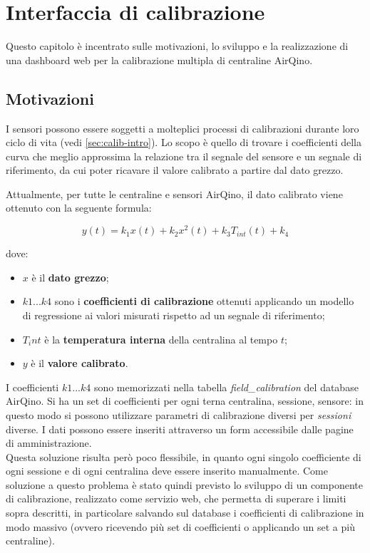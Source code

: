 \chapter{Interfaccia di calibrazione}\label{ch:interfaccia}
Questo capitolo è incentrato sulle motivazioni, lo sviluppo e la realizzazione di una dashboard web per la calibrazione multipla di centraline AirQino.

\section{Motivazioni}\label{sec:motivazioni}
I sensori possono essere soggetti a molteplici processi di calibrazioni durante loro ciclo di vita (vedi \ref{sec:calib-intro}). Lo scopo è quello di trovare i coefficienti della curva che meglio approssima la relazione tra il segnale del sensore e un segnale di riferimento, da cui poter ricavare il valore calibrato a partire dal dato grezzo.

Attualmente, per tutte le centraline e sensori AirQino, il dato calibrato viene ottenuto con la seguente formula:

$$y(t)=k_{1} x(t)+k_{2} x^{2}(t)+k_{3} T_{int}(t)+k_{4}$$\smallskip

dove:

\begin{itemize}
  \item $x$ è il \textbf{dato grezzo};
  \item $k1...k4$ sono i \textbf{coefficienti di calibrazione} ottenuti applicando un modello di regressione ai valori misurati rispetto ad un segnale di riferimento;
  \item $T_int$ è la \textbf{temperatura interna} della centralina al tempo $t$;
  \item $y$ è il \textbf{valore calibrato}.
\end{itemize}

I coefficienti $k1...k4$ sono memorizzati nella tabella \textit{field\_calibration} del database AirQino. Si ha
un set di coefficienti per ogni terna centralina, sessione, sensore: in questo modo si possono utilizzare parametri di calibrazione diversi per \textit{sessioni} diverse. I dati possono essere inseriti attraverso un form accessibile dalle pagine di amministrazione.\\

Questa soluzione risulta però poco flessibile, in quanto ogni singolo coefficiente di ogni sessione e di ogni centralina deve essere inserito manualmente. Come soluzione a questo problema è stato quindi previsto lo sviluppo di un componente di calibrazione, realizzato come servizio web, che permetta di superare i limiti sopra descritti, in particolare salvando sul database i coefficienti di calibrazione in modo massivo (ovvero ricevendo più set di coefficienti o applicando un set a più centraline).

